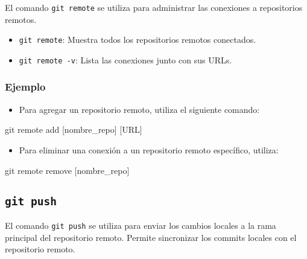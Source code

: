 \documentclass[
  letterpaper,
  DIV=11,
  numbers=noendperiod]{scrartcl}
\newenvironment{Shaded}{}{}
\newcommand{\FunctionTok}[1]{\textcolor[rgb]{0.44,0.26,0.76}{#1}}
\newcommand{\NormalTok}[1]{\textcolor[rgb]{0.14,0.16,0.18}{#1}}
\newcommand{\PreprocessorTok}[1]{\textcolor[rgb]{0.84,0.23,0.29}{#1}}
\newcommand{\SpecialStringTok}[1]{\textcolor[rgb]{0.01,0.18,0.38}{#1}}
\providecommand{\tightlist}{%
  \setlength{\itemsep}{0pt}\setlength{\parskip}{0pt}}\usepackage{longtable,booktabs,array}
\begin{document}
El comando \texttt{git\ remote} se utiliza para administrar las
conexiones a repositorios remotos.

\begin{itemize}
\tightlist
\item
  \texttt{git\ remote}: Muestra todos los repositorios remotos
  conectados.
\item
  \texttt{git\ remote\ -v}: Lista las conexiones junto con sus URLs.
\end{itemize}

\hypertarget{ejemplo-2}{%
\subsubsection{Ejemplo}\label{ejemplo-2}}

\begin{itemize}
\tightlist
\item
  Para agregar un repositorio remoto, utiliza el siguiente comando:
\end{itemize}

\begin{Shaded}
\begin{Highlighting}[]
\FunctionTok{git}\NormalTok{ remote add }\PreprocessorTok{[}\SpecialStringTok{nombre\_repo}\PreprocessorTok{]} \PreprocessorTok{[}\SpecialStringTok{URL}\PreprocessorTok{]}
\end{Highlighting}
\end{Shaded}

\begin{itemize}
\tightlist
\item
  Para eliminar una conexión a un repositorio remoto específico,
  utiliza:
\end{itemize}

\begin{Shaded}
\begin{Highlighting}[]
\FunctionTok{git}\NormalTok{ remote remove }\PreprocessorTok{[}\SpecialStringTok{nombre\_repo}\PreprocessorTok{]}
\end{Highlighting}
\end{Shaded}

\hypertarget{git-push}{%
\subsection{\texorpdfstring{\texttt{git\ push}}{git push}}\label{git-push}}

El comando \texttt{git\ push} se utiliza para enviar los cambios locales
a la rama principal del repositorio remoto. Permite sincronizar los
commits locales con el repositorio remoto.
\end{document}
